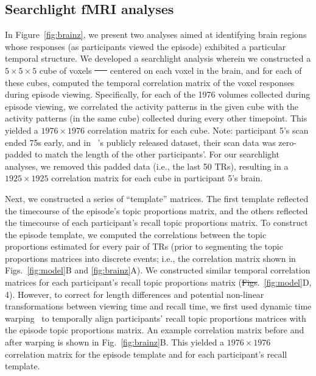 \documentclass[10pt]{article}
\renewcommand{\includegraphics}[2][]{} %
\newcommand{\corrmats}{4} %
\providecommand{\DIFaddtex}[1]{{\protect\color{blue}\uwave{#1}}} %
\providecommand{\DIFdeltex}[1]{{\protect\color{red}\sout{#1}}}                      %
\providecommand{\DIFaddbegin}{} %
\providecommand{\DIFaddend}{} %
\providecommand{\DIFdelbegin}{} %
\providecommand{\DIFdelend}{} %
\providecommand{\DIFadd}[1]{\texorpdfstring{\DIFaddtex{#1}}{#1}} %
\providecommand{\DIFdel}[1]{\texorpdfstring{\DIFdeltex{#1}}{}} %
\newcommand{\DIFscaledelfig}{0.5}
\newlength{\DIFdelgraphicswidth} %
\newlength{\DIFdelgraphicsheight} %
\newcommand{\DIFaddincludegraphics}[2][]{{\color{blue}\fbox{\DIFOincludegraphics[#1]{#2}}}} %
\newcommand{\DIFdelincludegraphics}[2][]{%
\sbox{\DIFdelgraphicsbox}{\DIFOincludegraphics[#1]{#2}}%
\settoboxwidth{\DIFdelgraphicswidth}{\DIFdelgraphicsbox} %
\settoboxtotalheight{\DIFdelgraphicsheight}{\DIFdelgraphicsbox} %
\scalebox{\DIFscaledelfig}{%
\parbox[b]{\DIFdelgraphicswidth}{\usebox{\DIFdelgraphicsbox}\\[-\baselineskip] \rule{\DIFdelgraphicswidth}{0em}}\llap{\resizebox{\DIFdelgraphicswidth}{\DIFdelgraphicsheight}{%
\setlength{\unitlength}{\DIFdelgraphicswidth}%
\begin{picture}(1,1)%
\thicklines\linethickness{2pt} %
{\color[rgb]{1,0,0}\put(0,0){\framebox(1,1){}}}%
{\color[rgb]{1,0,0}\put(0,0){\line( 1,1){1}}}%
{\color[rgb]{1,0,0}\put(0,1){\line(1,-1){1}}}%
\end{picture}%
}\hspace*{3pt}}} %
} %
\DeclareRobustCommand{\DIFaddbegin}{\DIFOaddbegin \let\includegraphics\DIFaddincludegraphics} %
\DeclareRobustCommand{\DIFaddend}{\DIFOaddend \let\includegraphics\DIFOincludegraphics} %
\DeclareRobustCommand{\DIFdelbegin}{\DIFOdelbegin \let\includegraphics\DIFdelincludegraphics} %
\DeclareRobustCommand{\DIFdelend}{\DIFOaddend \let\includegraphics\DIFOincludegraphics} %
\begin{document}
\subsection*{Searchlight fMRI analyses}
In Figure~\ref{fig:brainz}, we present two analyses aimed at identifying brain regions whose responses (as participants viewed the episode) exhibited a particular temporal structure.  We developed a searchlight analysis wherein we constructed a $5 \times 5 \times 5$ cube of voxels \DIFdelbegin \DIFdel{~\mbox{%
\citep[following][]{ChenEtal17} }\hspace{0pt}%
}\DIFdelend centered on each voxel in the brain\DIFaddbegin \DIFadd{~\mbox{%
\citep{ChenEtal17}}\hspace{0pt}%
}\DIFaddend , and for each of these cubes, computed the temporal correlation matrix of the voxel responses during episode viewing.  Specifically, for each of the 1976 volumes collected during episode viewing, we correlated the activity patterns in the given cube with the activity patterns (in the same cube) collected during every other timepoint.  This yielded a $1976 \times 1976$ correlation matrix for each cube.  Note: participant 5's scan ended 75s early, and in \DIFaddbegin \DIFadd{Chen et al. (2017)}\DIFaddend ~\cite{ChenEtal17}'s publicly released dataset, their scan data was zero-padded to match the length of the other participants'.  For our searchlight analyses, we removed this padded data (i.e., the last 50 TRs), resulting in a $1925 \times 1925$ correlation matrix for each cube in participant 5's brain.

Next, we constructed a series of ``template'' matrices.  The first template reflected the timecourse of the episode's topic proportions matrix, and the others reflected the timecourse of each participant's recall topic proportions matrix.  To construct the episode template, we computed the correlations between the topic proportions estimated for every pair of TRs (prior to segmenting the topic proportions matrices into discrete events; i.e., the correlation matrix shown in Figs.~\ref{fig:model}B and \ref{fig:brainz}A).  We constructed similar temporal correlation matrices for each participant's recall topic proportions matrix (\DIFdelbegin \DIFdel{Figs}\DIFdelend \DIFaddbegin \DIFadd{Fig}\DIFaddend .~\ref{fig:model}D, \DIFaddbegin \DIFadd{Supp.\ Fig.~}\DIFaddend \corrmats).  However, to correct for length differences and potential non-linear transformations between viewing time and recall time, we first used dynamic time warping~\citep{BernClif94} to temporally align participants' recall topic proportions matrices with the episode topic proportions matrix.  An example correlation matrix before and after warping is shown in Fig.~\ref{fig:brainz}B.  This yielded a $1976 \times 1976$ correlation matrix for the episode template and for each participant's recall template.
\end{document}
